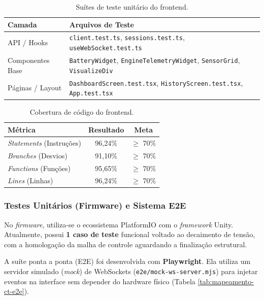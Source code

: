 \begin{table}[H]
\centering
\small
\renewcommand{\arraystretch}{1.2}
\caption{Suítes de teste unitário do frontend.}
\label{tab:testes-frontend}
\begin{tabularx}{\linewidth}{|l|X|}
\hline
\textbf{Camada} & \textbf{Arquivos de Teste} \\ \hline
API / Hooks & \texttt{client.test.ts}, \texttt{sessions.test.ts}, \texttt{useWebSocket.test.ts} \\ \hline
Componentes Base & \texttt{BatteryWidget}, \texttt{EngineTelemetryWidget}, \texttt{SensorGrid}, \texttt{VisualizeDiv} \\ \hline
Páginas / Layout & \texttt{DashboardScreen.test.tsx}, \texttt{HistoryScreen.test.tsx}, \texttt{App.test.tsx} \\ \hline
\end{tabularx}
\end{table}

\begin{table}[H]
\centering
\small
\renewcommand{\arraystretch}{1.2}
\caption{Cobertura de código do frontend.}
\label{tab:cobertura-frontend}
\begin{tabular}{|l|c|c|}
\hline
\textbf{Métrica} & \textbf{Resultado} & \textbf{Meta} \\ \hline
\textit{Statements} (Instruções) & 96,24\% & $\geq$ 70\% \\ \hline
\textit{Branches} (Desvios) & 91,10\% & $\geq$ 70\% \\ \hline
\textit{Functions} (Funções) & 95,65\% & $\geq$ 70\% \\ \hline
\textit{Lines} (Linhas) & 96,24\% & $\geq$ 70\% \\ \hline
\end{tabular}
\end{table}

\subsubsection{Testes Unitários (Firmware) e Sistema E2E}
No \textit{firmware}, utiliza-se o ecossistema PlatformIO com o \textit{framework} Unity. Atualmente, possui \textbf{1 caso de teste} funcional voltado ao decaimento de tensão, com a homologação da malha de controle aguardando a finalização estrutural.

A suíte ponta a ponta (E2E) foi desenvolvida com \textbf{Playwright}. Ela utiliza um servidor simulado (\textit{mock}) de WebSockets (\texttt{e2e/mock-ws-server.mjs}) para injetar eventos na interface sem depender do hardware físico (Tabela \ref{tab:mapeamento-ct-e2e}).

